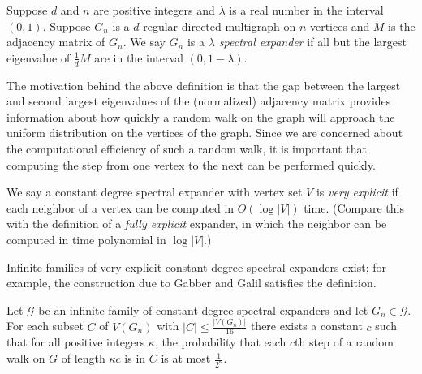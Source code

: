 \documentclass[]{article}
\begin{document}
\begin{definition}
  Suppose $d$ and $n$ are positive integers and $\lambda$ is a real number in the interval $(0, 1)$.
  Suppose $G_n$ is a $d$-regular directed multigraph on $n$ vertices and $M$ is the adjacency matrix of $G_n$.
  We say $G_n$ is a \emph{$\lambda$ spectral expander} if all but the largest eigenvalue of $\frac{1}{d}M$ are in the interval $(0, 1 - \lambda)$.
\end{definition}

The motivation behind the above definition is that the gap between the largest and second largest eigenvalues of the (normalized) adjacency matrix provides information about how quickly a random walk on the graph will approach the uniform distribution on the vertices of the graph.
Since we are concerned about the computational efficiency of such a random walk, it is important that computing the step from one vertex to the next can be performed quickly.

\begin{definition}
  We say a constant degree spectral expander with vertex set $V$ is \emph{very explicit} if each neighbor of a vertex can be computed in $O(\log |V|)$ time.
  (Compare this with the definition of a \emph{fully explicit} expander, in which the neighbor can be computed in time polynomial in $\log |V|$.)
\end{definition}

Infinite families of very explicit constant degree spectral expanders exist; for example, the construction due to Gabber and Galil \cite{gg79} satisfies the definition.

\begin{lemma}\label{lem:expander}
  Let $\mathcal{G}$ be an infinite family of constant degree spectral expanders and let $G_n \in \mathcal{G}$.
  For each subset $C$ of $V(G_n)$ with $|C| \leq \frac{|V(G_n)|}{16}$ there exists a constant $c$ such that for all positive integers $\kappa$, the probability that each $c$th step of a random walk on $G$ of length $\kappa c$ is in $C$ is at most $\frac{1}{2^\kappa}$.
\end{lemma}
\end{document}
